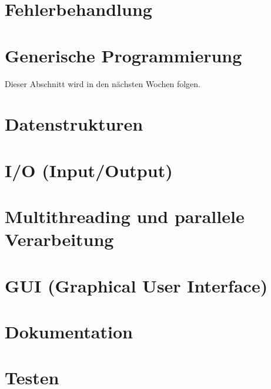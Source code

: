 %	

\section{Fehlerbehandlung} \functionalMark \imperativeMark \oopMark
	

%	

\section{Generische Programmierung} \functionalMark \imperativeMark \oopMark
	Dieser Abschnitt wird in den nächsten Wochen folgen.

\section{Datenstrukturen} \functionalMark \imperativeMark \oopMark
	

\section{I/O (Input/Output)} \functionalMark \imperativeMark \oopMark
	

\section{Multithreading und parallele Verarbeitung} \functionalMark \imperativeMark \oopMark
	

\section{GUI (Graphical User Interface)} \functionalMark \imperativeMark \oopMark
	

\section{Dokumentation} \functionalMark \imperativeMark \oopMark
	

\section{Testen} \functionalMark \imperativeMark \oopMark
	
